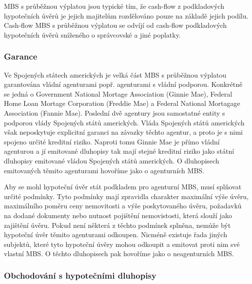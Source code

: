 \documentclass[a4paper]{book}
\begin{document}
MBS s průběžnou výplatou jsou typické tím, že cash-flow z podkladových hypotečních ůvěrů je jejich majitelům rozdělováno pouze na základě jejich podílu. Cash-flow MBS s průběžnou výplatou se odvíjí od cash-flow podkladových hypotečních úvěrů sníženého o správcovské a jiné poplatky.

\subsubsection{Garance}

Ve Spojených státech amerických je velká část MBS s průběžnou výplatou garantována vládní agenturami popř. agenturami s vládní podporou. Konkrétně se jedná o Government National Mortage Association (Ginnie Mae), Federal Home Loan Mortage Corporation (Freddie Mae) a Federal National Mortagage Association (Fannie Mae). Poslední dvě agentury jsou samostatné entity s podporou vlády Spojených států amerických. Vláda Spojených států amerických však neposkytuje explicitní garanci na závazky těchto agentur, a proto je s nimi spojeno určité kreditní riziko. Naproti tomu Ginnie Mae je přímo vládní agenturou a jí emitované dluhopisy tak mají stejné kreditní riziko jako státní dluhopisy emitované vládou Spojených států amerických. O dluhopisech emitovaných těmito agenturami hovoříme jako o agenturních MBS.

Aby se mohl hypoteční úvěr stát podkladem pro agenturní MBS, musí splňovat určité podmínky. Tyto podmínky mají zpravidla charakter maximální výše úvěru, maximálního poměru ceny nemovitosti a výše poskytovaného úvěru, požadavků na dodané dokumenty nebo nutnost pojištění nemovistosti, která slouží jako zajištění úvěru. Pokud není některá z těchto podmínek splněna, nemůže být hypoteční úvěr těmito agenturami odkoupen. Nicméně existuje řada jiných subjektů, které tyto hypoteční úvěry mohou odkoupit a emitovat proti nim své vlastní MBS. O těchto dluhopisech pak hovoříme jako o neagenturních MBS.

\subsubsection{Obchodování s hypotečními dluhopisy}
\end{document}
